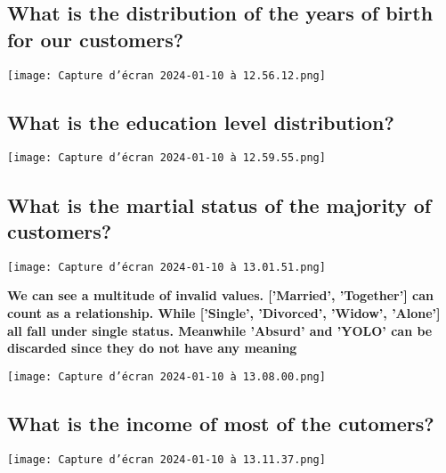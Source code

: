 \documentclass[12pt,a4paper]{report}
\begin{document}
\subsection{What is the distribution of the years of birth for our customers?}

\begin{center}
    \texttt{[image: Capture d’écran 2024-01-10 à 12.56.12.png]}
    
    \label{fig1}
\end{center}

\subsection{What is the education level distribution?}

\begin{center}

    \texttt{[image: Capture d’écran 2024-01-10 à 12.59.55.png]}
    
    \label{fig1}
\end{center}
\newpage
\subsection{What is the martial status of the majority of customers?}
\begin{center}
    \texttt{[image: Capture d’écran 2024-01-10 à 13.01.51.png]}            
    \label{fig1}
\end{center}
 \textbf{We can see a multitude of invalid values. ['Married', 'Together'] can count as a relationship. While ['Single', 'Divorced', 'Widow', 'Alone'] all fall under single status. Meanwhile 'Absurd' and 'YOLO' can be discarded since they do not have any meaning}
 \begin{center}
    \texttt{[image: Capture d’écran 2024-01-10 à 13.08.00.png]}            
    \label{fig1}
   
\end{center}
 

\subsection{What is the income of most of the cutomers?}
\begin{center}
    \texttt{[image: Capture d’écran 2024-01-10 à 13.11.37.png]}            
    \label{fig1}
\end{center}
\end{document}
